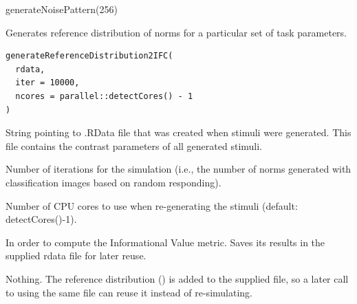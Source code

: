 \documentclass[letterpaper]{book}
\begin{document}
%
\begin{Examples}
\begin{ExampleCode}
generateNoisePattern(256)
\end{ExampleCode}
\end{Examples}
%
\begin{Description}
Generates reference distribution of norms for a particular set of task parameters.
\end{Description}
%
\begin{Usage}
\begin{verbatim}
generateReferenceDistribution2IFC(
  rdata,
  iter = 10000,
  ncores = parallel::detectCores() - 1
)
\end{verbatim}
\end{Usage}
%
\begin{Arguments}
\begin{ldescription}
\item[\code{rdata}] String pointing to .RData file that was created when stimuli were generated. This file contains the contrast parameters of all generated stimuli.

\item[\code{iter}] Number of iterations for the simulation (i.e., the number of norms generated with classification images based on random responding).

\item[\code{ncores}] Number of CPU cores to use when re-generating the stimuli (default: detectCores()-1).
\end{ldescription}
\end{Arguments}
%
\begin{Details}
In order to compute the Informational Value metric. Saves its results in the supplied rdata file for later reuse.
\end{Details}
%
\begin{Value}
Nothing. The reference distribution () is added to the supplied
 file, so a later call to  using the same file can
reuse it instead of re-simulating.
\end{Value}
%
\end{document}
